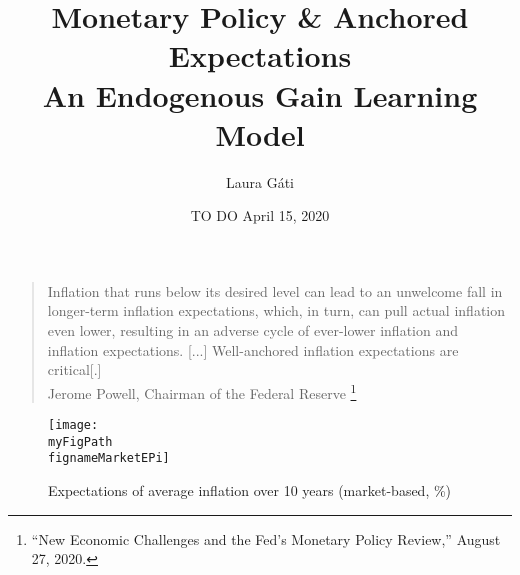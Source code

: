 \documentclass[10pt]{beamer}
\author[]{Laura G\'ati}
\institute[]{Boston College}
\title[]{Monetary Policy \& Anchored Expectations \\
An Endogenous Gain Learning Model}
\date[]{TO DO April 15, 2020}
\def \myFigPath {../../../figures/}
\def\myTinyFigScale{0.16}
\def\fignameMarketEPi{epi10_2020_06_04}
\begin{document}
\begin{frame}[plain] %

\maketitle

\end{frame}




\begin{frame}\label{motivation}
	
\begin{quote}
Inflation that runs below its desired level can lead to an unwelcome fall in longer-term inflation expectations, which, in turn, can pull actual inflation even lower, resulting in an adverse cycle of ever-lower inflation and inflation expectations.
[...] Well-anchored inflation expectations are critical[.]  \\
Jerome Powell, Chairman of the Federal Reserve \footnote{``New Economic Challenges and the Fed's Monetary Policy Review,''  August 27, 2020.} %
\end{quote}	




\end{frame}

\begin{frame}\label{TIPS}
	

\begin{figure}[h!]
\texttt{[image: \\myFigPath \\fignameMarketEPi]}
\caption{Expectations of average inflation over 10 years (market-based, \%)}
\label{epi}
\end{figure}



\vspace{-0.5cm}
\hfill \hyperlink{app_TIPS}{}
\end{frame}
\end{document}
